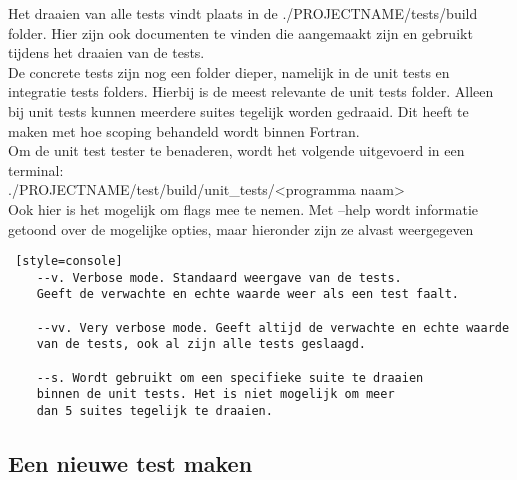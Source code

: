 \documentclass{article}
\begin{document}
Het draaien van alle tests vindt plaats in de ./PROJECTNAME/tests/build folder. Hier zijn ook documenten te vinden die aangemaakt zijn en gebruikt tijdens het draaien van de tests. 
\\
De concrete tests zijn nog een folder dieper, namelijk in de unit tests en integratie tests folders. Hierbij is de meest relevante de unit tests folder. Alleen bij unit tests kunnen meerdere suites tegelijk worden gedraaid. Dit heeft te maken met hoe scoping behandeld wordt binnen Fortran. 
\\
Om de unit test tester te benaderen, wordt het volgende uitgevoerd in een terminal: 
\\
./PROJECTNAME/test/build/unit\_tests/<programma naam>
\\
Ook hier is het mogelijk om flags mee te nemen. Met --help wordt informatie getoond over de mogelijke opties, maar hieronder zijn ze alvast weergegeven

\begin{lstlisting} [style=console]
    --v. Verbose mode. Standaard weergave van de tests. 
    Geeft de verwachte en echte waarde weer als een test faalt. 
    
    --vv. Very verbose mode. Geeft altijd de verwachte en echte waarde 
    van de tests, ook al zijn alle tests geslaagd.
    
    --s. Wordt gebruikt om een specifieke suite te draaien 
    binnen de unit tests. Het is niet mogelijk om meer 
    dan 5 suites tegelijk te draaien.
\end{lstlisting}

\subsection{Een nieuwe test maken}
\end{document}
